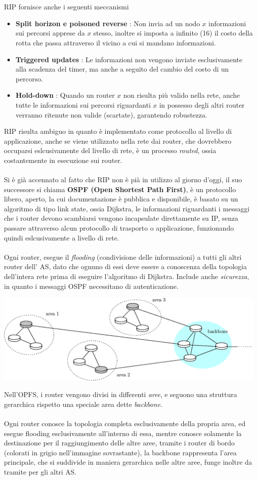 \documentclass[12pt, letterpaper]{article}
\newcommand{\acc}{\\\hphantom{}\\}
\begin{document}
\acc 
RIP fornisce anche i seguenti meccanismi\begin{itemize}
    \item \textbf{Split horizon e poisoned reverse} : Non invia ad un nodo $x$ informazioni sui percorsi apprese da 
    $x$ stesso, inoltre si imposta a infinito (16) il costo della rotta che passa attraverso il vicino a cui si
    mandano informazioni.
    \item \textbf{Triggered updates} : Le informazioni non vengono inviate esclusivamente alla scadenza del timer, ma 
    anche a seguito del cambio del costo di un percorso.
    \item \textbf{Hold-down} : Quando un router $x$ non risulta più valido nella rete, anche tutte le informazioni sui percorsi 
    riguardanti $x$ in possesso degli altri router verranno ritenute non valide (scartate), garantendo robustezza.
\end{itemize}
RIP risulta ambiguo in quanto è implementato come protocollo al livello di applicazione, anche se viene utilizzato nella rete 
dai router, che dovrebbero occuparsi eslcusivamente del livello di rete, è un processo \textit{routed}, ossia costantemente in 
esecuzione sui router.\acc 
Si è già accennato al fatto che RIP non è pià in utilizzo al giorno d'oggi, il suo successore si chiama
 \textbf{OSPF (Open Shortest Path First)}, è un protocollo libero, aperto, la cui documentazione è pubblica e disponibile, 
 è basato su un algoritmo di tipo link state, ossia Dijkstra, le informazioni riguardanti i messaggi che i router devono 
 scambiarsi vengono incapsulate direttamente su IP, senza passare attraverso alcun protocollo di trasporto o applicazione,
 funzionando quindi eslcusivamente a livello di rete.\acc 
 Ogni router, esegue il \textit{flooding} (condivisione delle informazioni) a tutti gli altri router dell' AS, dato che ognuno di 
 essi deve essere a conoscenza della topologia dell'intera rete prima di eseguire l'algoritmo di Dijkstra. Include anche 
 \textit{sicurezza}, in quanto i messaggi OSPF necessitano di autenticazione.\begin{center}
    \includegraphics[width=\textwidth ]{images/OPFS.eps}
\end{center}
Nell'OPFS, i router vengono divisi in differenti \textit{aree}, e seguono una struttura gerarchica rispetto una 
speciale area dette \textit{backbone}.\acc  Ogni router conosce la topologia completa esclusivamente della propria area, 
ed esegue flooding esclusivamente all'interno di essa, mentre 
conosce solamente la destinazione per il raggiungimento delle altre aree, tramite i router di bordo (colorati in grigio
nell'immagine sovrastante), la backbone rappresenta l'area principale, che si suddivide 
in maniera gerarchica nelle altre aree, funge inoltre da tramite per gli altri AS.
\end{document}
